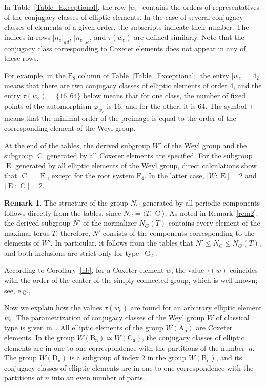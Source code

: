 \documentclass[a4paper,12pt]{amsart}
\theoremstyle{plain}
\theoremstyle{definition}
\newtheorem{remark}{Remark}
\begin{document}
In Table~\ref{Table_Exceptional}, the row $|w_e|$ contains the orders of representatives of the conjugacy classes of elliptic elements. In the case of several conjugacy classes of elements of a given order, the subscripts indicate their number. The indices in rows $|n_e|_{ad}$, $|n_e|_{sc}$, and $\tau(w_e)$ are defined similarly. Note that the conjugacy class corresponding to Coxeter elements does not appear in any of these rows.

For example, in the $\operatorname{E_8}$ column of Table~\ref{Table_Exceptional}, the entry $|w_e|=4_2$ means that there are two conjugacy classes of elliptic elements of order 4, and the entry $\tau(w_e)=\{16,64\}$ below means that for one class, the number of fixed points of the automorphism $\varphi_{w_e}$ is 16, and for the other, it is 64. The symbol $+$ means that the minimal order of the preimage is equal to the order of the corresponding element of the Weyl group.

At the end of the tables, the derived subgroup $W'$ of the Weyl group and the subgroup $\operatorname{C}$ generated by all Coxeter elements are specified. For the subgroup $\operatorname{E}$ generated by all elliptic elements of the Weyl group, direct calculations show that $\operatorname{C}=\operatorname{E}$, except for the root system $\operatorname{F_4}$. In the latter case, $|W:\operatorname{E}|=2$ and $|\operatorname{E}:\operatorname{C}|=2$.

\begin{remark}
The structure of the group $N_{\operatorname{C}}$ generated by all periodic components follows directly from the tables, since $N_{\operatorname{C}}=\langle T, \operatorname{C}\rangle$. As noted in Remark~\ref{rem2}, the derived subgroup $N'$ of the normalizer $N_G(T)$ contains every element of the maximal torus $T$; therefore, $N'$ consists of the components corresponding to the elements of $W'$. In particular, it follows from the tables that $N'\leq N_{\operatorname{C}}\leq N_G(T)$, and both inclusions are strict only for type~$\operatorname{G}_2$.
\end{remark}

According to Corollary~\ref{nb}, for a Coxeter element $w$, the value $\tau(w)$ coincides with the order of the center of the simply connected group, which is
well-known; see, e.g.,~\cite[Table~3]{VinbergOn}.

Now we explain how the values $\tau(w_e)$ are found for an arbitrary elliptic element $w_e$. The parametrization of conjugacy classes of the Weyl group ${W}$ of classical type is given in~\cite[\S7]{CarWeyl}. All elliptic elements of the group ${W(\operatorname{A_n})}$ are Coxeter elements. In the group ${W(\operatorname{B_n})}\simeq {W(\operatorname{C_n})}$, the conjugacy classes of elliptic elements are in one-to-one correspondence with the partitions of the number~$n$. The group ${W(\operatorname{D_n})}$ is a subgroup of index 2 in the group ${W(\operatorname{B_n})}$, and its conjugacy classes of elliptic elements are in one-to-one correspondence with the partitions of $n$ into an even number of parts.
\end{document}
